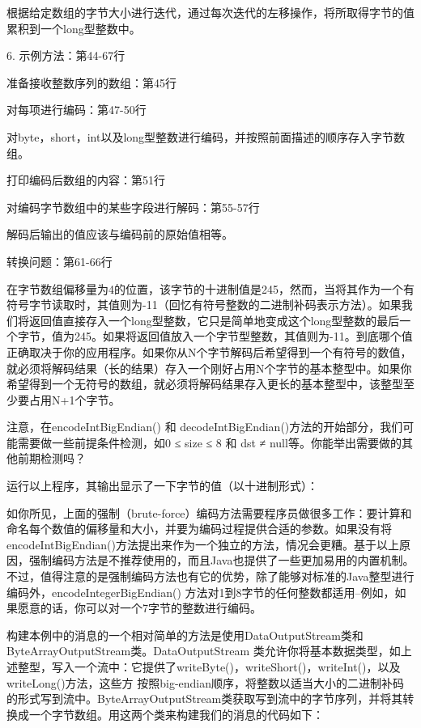 		根据给定数组的字节大小进行迭代，通过每次迭代的左移操作，将所取得字节的值累积到一个long型整数中。 

		6. 示例方法：第44-67行 

		准备接收整数序列的数组：第45行 

		对每项进行编码：第47-50行 

		对byte，short，int以及long型整数进行编码，并按照前面描述的顺序存入字节数组。 

		打印编码后数组的内容：第51行 

		对编码字节数组中的某些字段进行解码：第55-57行 

		解码后输出的值应该与编码前的原始值相等。 

		转换问题：第61-66行 

		在字节数组偏移量为4的位置，该字节的十进制值是245，然而，当将其作为一个有符号字节读取时，其值则为-11（回忆有符号整数的二进制补码表示方法）。如果我们将返回值直接存入一个long型整数，它只是简单地变成这个long型整数的最后一个字节，值为245。如果将返回值放入一个字节型整数，其值则为-11。到底哪个值正确取决于你的应用程序。如果你从N个字节解码后希望得到一个有符号的数值，就必须将解码结果（长的结果）存入一个刚好占用N个字节的基本整型中。如果你希望得到一个无符号的数组，就必须将解码结果存入更长的基本整型中，该整型至少要占用N+1个字节。 

		注意，在encodeIntBigEndian() 和 decodeIntBigEndian()方法的开始部分，我们可能需要做一些前提条件检测，如0 ≤ size ≤ 8 和 dst ≠ null等。你能举出需要做的其他前期检测吗？ 

		运行以上程序，其输出显示了一下字节的值（以十进制形式）： 

		

		如你所见，上面的强制（brute-force）编码方法需要程序员做很多工作：要计算和命名每个数值的偏移量和大小，并要为编码过程提供合适的参数。如果没有将encodeIntBigEndian()方法提出来作为一个独立的方法，情况会更糟。基于以上原因，强制编码方法是不推荐使用的，而且Java也提供了一些更加易用的内置机制。不过，值得注意的是强制编码方法也有它的优势，除了能够对标准的Java整型进行编码外，encodeIntegerBigEndian() 方法对1到8字节的任何整数都适用--例如，如果愿意的话，你可以对一个7字节的整数进行编码。 

		构建本例中的消息的一个相对简单的方法是使用DataOutputStream类和ByteArrayOutputStream类。DataOutputStream 类允许你将基本数据类型，如上述整型，写入一个流中：它提供了writeByte()，writeShort()，writeInt()，以及writeLong()方法，这些方 按照big-endian顺序，将整数以适当大小的二进制补码的形式写到流中。ByteArrayOutputStream类获取写到流中的字节序列，并将其转换成一个字节数组。用这两个类来构建我们的消息的代码如下： 

